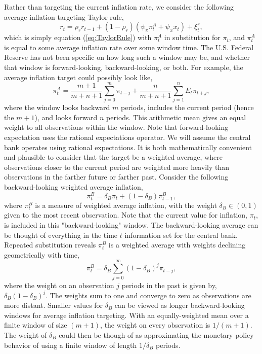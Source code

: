 \documentclass[english,authoryear,12pt]{elsarticle}
\begin{document}
Rather than targeting the current inflation rate, we consider the following average inflation targeting Taylor rule,
\begin{equation}\label{eq:TaylorRuleAIT}
	r_t = \rho_r r_{t-1} + (1-\rho_r) \left( \psi_\pi \pi_t^A + \psi_x x_t \right) + \xi_t^{r},
\end{equation}
which is simply equation (\ref{eq:TaylorRule}) with $\pi_t^A$ in substitution for $\pi_t$, and $\pi_t^A$ is equal to some average inflation rate over some window time. The U.S. Federal Reserve has not been specific on how long such a window may be, and whether that window is forward-looking, backward-looking, or both. For example, the average inflation target could possibly look like,
\begin{equation}\label{eq:ait}
	\pi_t^A = \frac{m+1}{m+n+1}\sum_{j=0}^{m} \pi_{t-j} + \frac{n}{m+n+1}\sum_{j=1}^{n} E_t \pi_{t+j},
\end{equation}
where the window looks backward $m$ periods, includes the current period (hence the $m+1$), and looks forward $n$ periods.  This arithmetic mean gives an equal weight to all observations within the window. Note that forward-looking expectation uses the rational expectations operator. We will assume the central bank operates using rational expectations. It is both mathematically convenient and plausible to consider that the target be a weighted average, where observations closer to the current period are weighted more heavily than observations in the farther future or farther past. Consider the following backward-looking weighted average inflation,
\begin{equation}\label{eq:backward}
	\pi_t^B = \delta_B \pi_t + (1-\delta_B) \pi_{t-1}^B,
\end{equation}
where $\pi_t^B$ is a measure of weighted average inflation, with the weight $\delta_B \in (0,1)$ given to the most recent observation. Note that the current value for inflation, $\pi_t$, is included in this "backward-looking" window. The backward-looking average can be thought of everything in the time $t$ information set for the central bank. Repeated substitution reveals $\pi_t^B$ is a weighted average with weights declining geometrically with time,
\begin{equation}\label{eq:backward_all}
	\pi_t^B = \delta_B \sum_{j=0}^{\infty} (1-\delta_B)^j \pi_{t-j},
\end{equation}
where the weight on an observation $j$ periods in the past is given by, $\delta_B (1-\delta_B)^j$. The weights sum to one and converge to zero as observations are more distant. Smaller values for $\delta_B$ can be viewed as longer backward-looking windows for average inflation targeting. With an equally-weighted mean over a finite window of size $(m+1)$, the weight on every observation is $1/(m+1)$. The weight of $\delta_B$ could then be though of as approximating the monetary policy behavior of using a finite window of length $1 / \delta_B$ periods.
\end{document}
